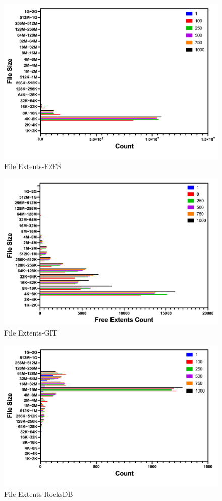 \begin{figure}[t]
    \centering
	\includegraphics[width=0.95\columnwidth]{graphs/file_extents_f2fs}
	\caption{File Extents-F2FS}
	\label{f:file_extents_f2fs}
\end{figure}

\begin{figure}[t]
    \centering
	\includegraphics[width=0.95\columnwidth]{graphs/file_extents_git}
	\caption{File Extents-GIT}
	\label{f:file_extents_git}
\end{figure}

\begin{figure}[t]
    \centering
	\includegraphics[width=0.95\columnwidth]{graphs/file_extents_rocksdb}
	\caption{File Extents-RocksDB}
	\label{f:file_extents_rocksdb}
\end{figure}

